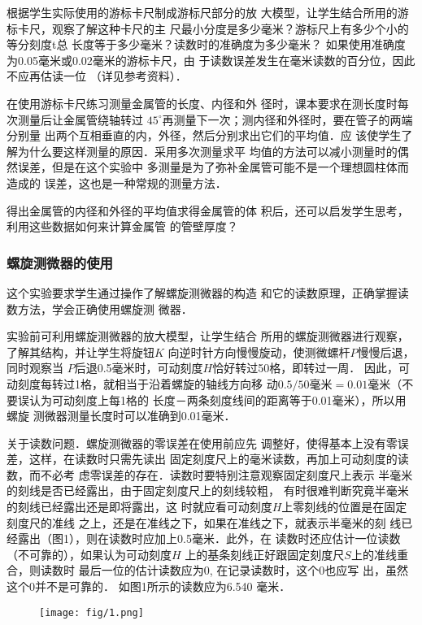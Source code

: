根据学生实际使用的游标卡尺制成游标尺部分的放
大模型，让学生结合所用的游标卡尺，观察了解这种卡尺的主
尺最小分度是多少毫米？游标尺上有多少个小的等分刻度t总
长度等于多少毫米？读数时的准确度为多少毫米？
如果使用准确度为0.05毫米或0.02毫米的游标卡尺，由
于读数误差发生在毫米读数的百分位，因此不应再估读一位
（详见参考资料）．

在使用游标卡尺练习测量金属管的长度、内径和外
径时，课本要求在测长度时每次测量后让金属管绕轴转过
$45^{\circ}$再测量下一次；测内径和外径时，要在管子的两端分别量
出两个互相垂直的内，外径，然后分别求出它们的平均值．应
该使学生了解为什么要这样测量的原因．采用多次测量求平
均值的方法可以减小测量时的偶然误差，但是在这个实验中
多测量是为了弥补金属管可能不是一个理想圆柱体而造成的
误差，这也是一种常规的测量方法．

得出金属管的内径和外径的平均值求得金属管的体
积后，还可以启发学生思考，利用这些数据如何来计算金属管
的管壁厚度？

\subsubsection{螺旋测微器的使用}
这个实验要求学生通过操作了解螺旋测微器的构造
和它的读数原理，正确掌握读数方法，学会正确使用螺旋测
微器．

实验前可利用螺旋测微器的放大模型，让学生结合
所用的螺旋测微器进行观察，了解其结构，并让学生将旋钮$K$
向逆时针方向慢慢旋动，使测微螺杆$P$慢慢后退，同时观察当
$P$后退0.5毫米时，可动刻度$H$恰好转过50格，即转过一周．
因此，可动刻度每转过1格，就相当于沿着螺旋的轴线方向移
动$0.5/50$毫米$=0.01$毫米（不要误认为可动刻度上每1格的
长度－两条刻度线间的距离等于0.01毫米），所以用螺旋
测微器测量长度时可以准确到0.01毫米．

关于读数问题．螺旋测微器的零误差在使用前应先
调整好，使得基本上没有零误差，这样，在读数时只需先读出
固定刻度尺上的毫米读数，再加上可动刻度的读数，而不必考
虑零误差的存在．读数时要特别注意观察固定刻度尺上表示
半毫米的刻线是否已经露出，由于固定刻度尺上的刻线较粗，
有时很难判断究竟半毫米的刻线已经露出还是即将露出，这
时就应看可动刻度$H$上零刻线的位置是在固定刻度尺的准线
之上，还是在准线之下，如果在准线之下，就表示半毫米的刻
线已经露出（图1），则在读数时应加上0.5毫米．此外，在
读数时还应估计一位读数（不可靠的），如果认为可动刻度$H$
上的基条刻线正好跟固定刻度尺$S$上的准线重合，则读数时
最后一位的估计读数应为0, 在记录读数时，这个0也应写
出，虽然这个0并不是可靠的．
如图1所示的读数应为6.540
毫米．

\begin{figure}[htp]
    \centering
\texttt{[image: fig/1.png]}
    \caption{}
\end{figure}


